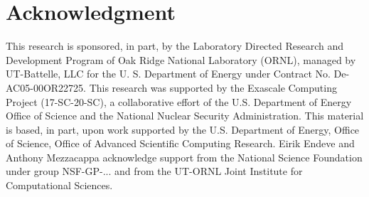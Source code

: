 \section{Acknowledgment} \label{se:Acknowledgment}

This research is sponsored, in part, by the Laboratory Directed Research and Development Program of Oak Ridge National Laboratory (ORNL), managed by UT-Battelle, LLC for the U. S. Department of Energy under Contract No. De-AC05-00OR22725.  
This research was supported by the Exascale Computing Project (17-SC-20-SC), a collaborative effort of the U.S. Department of Energy Office of Science and the National Nuclear Security Administration.  
This material is based, in part, upon work supported by the U.S. Department of Energy, Office of Science, Office of Advanced Scientific Computing Research.
Eirik Endeve and Anthony Mezzacappa acknowledge support from the National Science Foundation under group NSF-GP-... and from the UT-ORNL Joint Institute for Computational Sciences.